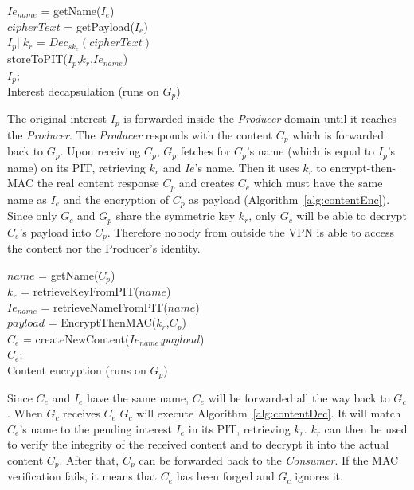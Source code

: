 \documentclass[conference,letterpaper,10pt]{IEEEtran}
\begin{document}
\begin{algorithm}[]\label{alg:interestDecap}
$Ie_{name}$ = getName($I_e$)\\
$cipherText$ = getPayload($I_e$)\\
$I_p||k_r$ = $Dec_{sk_e}(cipherText)$\\
storeToPIT($I_p$,$k_r$,$Ie_{name}$)\\
\Return $I_p$;\\
\caption{Interest decapsulation (runs on $G_p$)}
\end{algorithm}

The original interest $I_p$ is forwarded inside the \textit{Producer} domain until it reaches the \textit{Producer}. The \textit{Producer} responds with the content $C_p$ which is forwarded back to $G_p$.
Upon receiving $C_p$, $G_p$ fetches for $C_p$'s name (which is equal to $I_p$'s name) on its PIT, retrieving $k_r$ and $Ie$'s name. Then it uses $k_r$ to encrypt-then-MAC the real content response $C_p$ and creates $C_e$ which must have the same name as $I_e$ and the encryption of $C_p$ as payload (Algorithm~\ref{alg:contentEnc}). Since only $G_c$ and $G_p$ share the symmetric key $k_r$, only $G_c$ will be able to decrypt $C_e$'s payload into $C_p$. Therefore nobody from outside the VPN is able to access the content nor the Producer's identity. 

\begin{algorithm}[]\label{alg:contentEnc}
$name$ = getName($C_p$)\\
$k_r$ = retrieveKeyFromPIT($name$)\\
$Ie_{name}$ = retrieveNameFromPIT($name$)\\
$payload$ = EncryptThenMAC($k_r$,$C_p$)\\
$C_e$ = createNewContent($Ie_{name}$,$payload$)\\
\Return $C_e$;\\
\caption{Content encryption  (runs on $G_p$)}
\end{algorithm}

Since $C_e$ and $I_e$ have the same name, $C_e$ will be forwarded all the way back to $G_c$. When $G_c$  receives $C_e$ $G_c$ will execute Algorithm~\ref{alg:contentDec}. It will match $C_e$'s name to the pending interest $I_e$ in its PIT, retrieving $k_r$. $k_r$ can then be used to verify the integrity of the received content and to decrypt it into the actual content $C_p$. After that, $C_p$ can be forwarded back to the \textit{Consumer}. If the MAC verification fails, it means that $C_e$ has been forged and $G_c$ ignores it.
\end{document}
